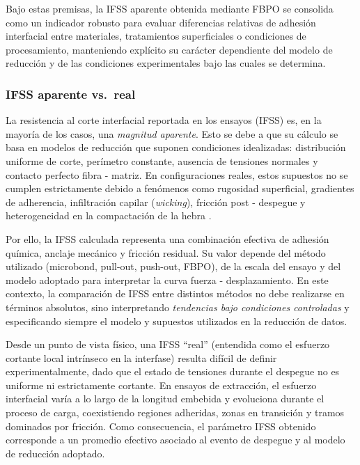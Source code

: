 Bajo estas premisas, la IFSS aparente obtenida mediante FBPO se consolida como un indicador robusto
para evaluar diferencias relativas de adhesión interfacial entre materiales, tratamientos
superficiales o condiciones de procesamiento, manteniendo explícito su carácter dependiente del
modelo de reducción y de las condiciones experimentales bajo las cuales se determina.

\subsubsection{IFSS aparente vs.\ real}

La resistencia al corte interfacial reportada en los ensayos (IFSS) es, en la mayoría de los casos,
una \emph{magnitud aparente}. Esto se debe a que su cálculo se basa en modelos de reducción que
suponen condiciones idealizadas: distribución uniforme de corte, perímetro constante, ausencia de
tensiones normales y contacto perfecto fibra - matriz. En configuraciones reales, estos supuestos no se
cumplen estrictamente debido a fenómenos como rugosidad superficial, gradientes de adherencia,
infiltración capilar (\textit{wicking}), fricción post - despegue y heterogeneidad en la compactación de
la hebra \cite{Liu2021,AhmadvashAghbash2024IMR}.

Por ello, la IFSS calculada representa una combinación efectiva de adhesión química, anclaje
mecánico y fricción residual. Su valor depende del método utilizado (microbond, pull-out,
push-out, FBPO), de la escala del ensayo y del modelo adoptado para interpretar la curva
fuerza - desplazamiento. En este contexto, la comparación de IFSS entre distintos métodos no debe
realizarse en términos absolutos, sino interpretando \emph{tendencias bajo condiciones controladas} y
especificando siempre el modelo y supuestos utilizados en la reducción de datos.

Desde un punto de vista físico, una IFSS ``real'' (entendida como el esfuerzo cortante local
intrínseco en la interfase) resulta difícil de definir experimentalmente, dado que el estado de
tensiones durante el despegue no es uniforme ni estrictamente cortante. En ensayos de extracción, el
esfuerzo interfacial varía a lo largo de la longitud embebida y evoluciona durante el proceso de
carga, coexistiendo regiones adheridas, zonas en transición y tramos dominados por fricción. Como
consecuencia, el parámetro IFSS obtenido corresponde a un promedio efectivo asociado al evento de
despegue y al modelo de reducción adoptado.

